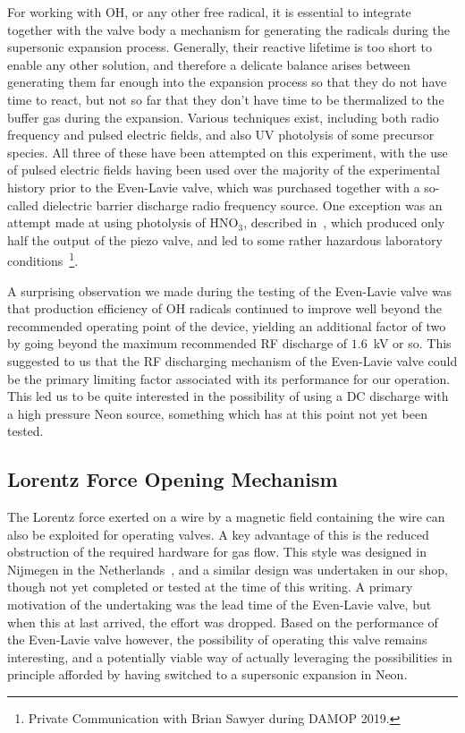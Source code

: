 For working with OH, or any other free radical, it is essential to integrate together with the valve body a mechanism for generating the radicals during the supersonic expansion process.
Generally, their reactive lifetime is too short to enable any other solution, and therefore a delicate balance arises between generating them far enough into the expansion process so that they do not have time to react, but not so far that they don't have time to be thermalized to the buffer gas during the expansion.
Various techniques exist, including both radio frequency and pulsed electric fields, and also UV photolysis of some precursor species.
All three of these have been attempted on this experiment, with the use of pulsed electric fields having been used over the majority of the experimental history prior to the Even-Lavie valve, which was purchased together with a so-called dielectric barrier discharge radio frequency source.
One exception was an attempt made at using photolysis of HNO$_3$, described in~\citep[Sec.~3.1.4.2]{SawyerThesis2010}, which produced only half the output of the piezo valve, and led to some rather hazardous laboratory conditions~\footnote{Private Communication with Brian Sawyer during DAMOP 2019.}\!.

A surprising observation we made during the testing of the Even-Lavie valve was that production efficiency of OH radicals continued to improve well beyond the recommended operating point of the device, yielding an additional factor of two by going beyond the maximum recommended RF discharge of $1.6$~kV or so.
This suggested to us that the RF discharging mechanism of the Even-Lavie valve could be the primary limiting factor associated with its performance for our operation.
This led us to be quite interested in the possibility of using a DC discharge with a high pressure Neon source, something which has at this point not yet been tested.

\subsection{Lorentz Force Opening Mechanism}

The Lorentz force exerted on a wire by a magnetic field containing the wire can also be exploited for operating valves.
A key advantage of this is the reduced obstruction of the required hardware for gas flow.
This style was designed in Nijmegen in the Netherlands~\cite{Yan2013}, and a similar design was undertaken in our shop, though not yet completed or tested at the time of this writing.
A primary motivation of the undertaking was the lead time of the Even-Lavie valve, but when this at last arrived, the effort was dropped.
Based on the performance of the Even-Lavie valve however, the possibility of operating this valve remains interesting, and a potentially viable way of actually leveraging the possibilities in principle afforded by having switched to a supersonic expansion in Neon.


